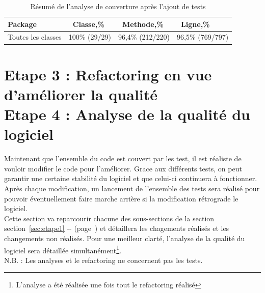 \documentclass[12pt,a4paper,final]{article}
\newcommand{\annexe}[1]{annexe~\ref{#1} (page~\pageref{#1})}
\newcommand{\refsection}[1]{section~\ref{#1} -\nameref{#1}- (page~\pageref{#1})}
\begin{document}
\begin{table}[!h]
\begin{tabular}{|l|l|l|l|}
\hline
Package & \ Classe,\% & \ Methode,\% & \ Ligne,\% \\
\hline
Toutes les classes & 100\% (29/29) & 96,4\% (212/220) & 96,5\% (769/797) \\
\hline
\end{tabular}
\caption{Résumé de l'analyse de couverture après l'ajout de tests}
\label{Résumé de l'analyse de couverture après l'ajout de tests}
\end{table}

\newpage
\section{Etape 3 : Refactoring en vue d'améliorer la qualité\\Etape 4 : Analyse de la qualité du logiciel} \label{sec:etape3} \label{sec:etape4}
Maintenant que l'ensemble du code est couvert par les test, il est réaliste de vouloir modifier le code pour l'améliorer. Grace aux différents tests, on peut garantir une certaine stabilité du logiciel et que celui-ci continuera à fonctionner. Après chaque modification, un lancement de l'ensemble des tests sera réalisé pour pouvoir éventuellement faire marche arrière si la modification rétrograde le logiciel.\\
Cette section va reparcourir chacune des sous-sections de la section \refsection{sec:etape1} et détaillera les chagements réalisés et les changements non réalisés. Pour une meilleur clarté, l'analyse de la qualité du logiciel sera détaillée simultanément\footnote{L'analyse a été réalisée une fois tout le refactoring réalisé}.\\
N.B. : Les analyses et le refactoring ne concernent pas les tests.

\end{document}
